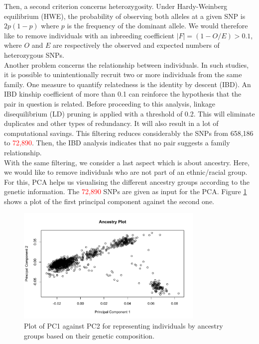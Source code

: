 \documentclass[a4paper, 12pt]{article}
\begin{document}
Then, a second criterion concerns heterozygosity. Under Hardy-Weinberg equilibrium (HWE), the probability of observing both alleles at a given SNP is $2p(1-p)$ where $p$ is the frequency of the dominant allele. We would therefore like to remove individuals with an inbreeding coefficient $|F| = (1-O/E) >0.1$, where $O$ and $E$ are respectively the observed and expected numbers of heterozygous SNPs. \\

Another problem concerns the relationship between individuals. In such studies, it is possible to unintentionally recruit two or more individuals from the same family. One measure to quantify relatedness is the identity by descent (IBD). An IBD kinship coefficient of more than 0.1 can reinforce the hypothesis that the pair in question is related. Before proceeding to this analysis, linkage disequilibrium (LD) pruning is applied with a threshold of 0.2. This will eliminate duplicates and other types of redundancy. It will also result in a lot of computational savings. This filtering reduces considerably the SNPs from 658,186 to \textcolor{red}{72,890}. Then, the IBD analysis indicates that no pair suggests a family relationship. \\
With the same filtering, we consider a last aspect which is about ancestry. Here, we would like to remove individuals who are not part of an ethnic/racial group. For this, PCA helps us visualising the different ancestry groups according to the genetic information. The \textcolor{red}{72,890} SNPs are given as input for the PCA. Figure \ref{fig:PCA} shows a plot of the first principal component against the second one. \\

\begin{figure}[!ht]
\centering
\includegraphics[width=0.8\textwidth]{../Plots/PCA.pdf}
\caption{Plot of PC1 against PC2 for representing individuals by ancestry groups based on their genetic composition.}
\label{fig:PCA}
\end{figure}
\end{document}
